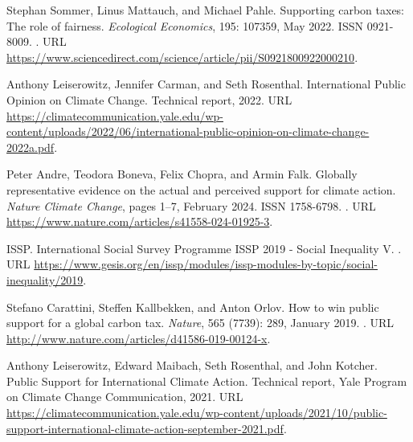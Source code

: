 \documentclass[12pt,english]{article}
\begin{document}
\begin{thebibliography}{55}
  Stephan Sommer, Linus Mattauch, and Michael Pahle.
  \newblock Supporting carbon taxes: {{The}} role of fairness.
  \newblock \emph{Ecological Economics}, 195: 107359, May 2022.
  \newblock ISSN 0921-8009.
  \newblock {}.
  \newblock URL
    \url{https://www.sciencedirect.com/science/article/pii/S0921800922000210}.
  
  Anthony Leiserowitz, Jennifer Carman, and Seth Rosenthal.
  \newblock International {{Public Opinion}} on {{Climate Change}}.
  \newblock Technical report, 2022.
  \newblock URL
    \url{https://climatecommunication.yale.edu/wp-content/uploads/2022/06/international-public-opinion-on-climate-change-2022a.pdf}.
  
  Peter Andre, Teodora Boneva, Felix Chopra, and Armin Falk.
  \newblock Globally representative evidence on the actual and perceived support
    for climate action.
  \newblock \emph{Nature Climate Change}, pages 1--7, February 2024.
  \newblock ISSN 1758-6798.
  \newblock {}.
  \newblock URL \url{https://www.nature.com/articles/s41558-024-01925-3}.
  
  ISSP.
  \newblock International {{Social Survey Programme ISSP}} 2019 - {{Social
    Inequality V}}.
  .
  \newblock URL
    \url{https://www.gesis.org/en/issp/modules/issp-modules-by-topic/social-inequality/2019}.
  
  Stefano Carattini, Steffen Kallbekken, and Anton Orlov.
  \newblock How to win public support for a global carbon tax.
  \newblock \emph{Nature}, 565 (7739): 289, January 2019.
  \newblock {}.
  \newblock URL \url{http://www.nature.com/articles/d41586-019-00124-x}.
  
  Anthony Leiserowitz, Edward Maibach, Seth Rosenthal, and John Kotcher.
  \newblock Public {{Support}} for {{International Climate Action}}.
  \newblock Technical report, Yale Program on Climate Change Communication, 2021.
  \newblock URL
    \url{https://climatecommunication.yale.edu/wp-content/uploads/2021/10/public-support-international-climate-action-september-2021.pdf}.
  

\end{thebibliography}
\end{document}
